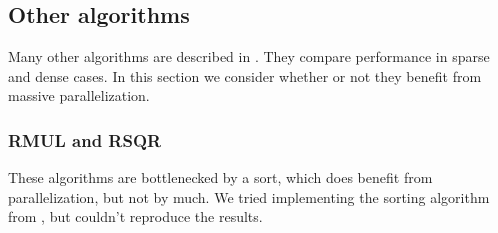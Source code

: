 







\subsection{Other algorithms}
Many other algorithms are described in \cite{monagan-2012-sparse-powering}. They compare performance in sparse and dense cases. In this section we consider whether or not they benefit from massive parallelization.

\subsubsection{RMUL and RSQR}
These algorithms are bottlenecked by a sort, which does benefit from parallelization, but not by much. We tried implementing the sorting algorithm from \cite{gupta-2023-gpu-sort}, but couldn't reproduce the results.

